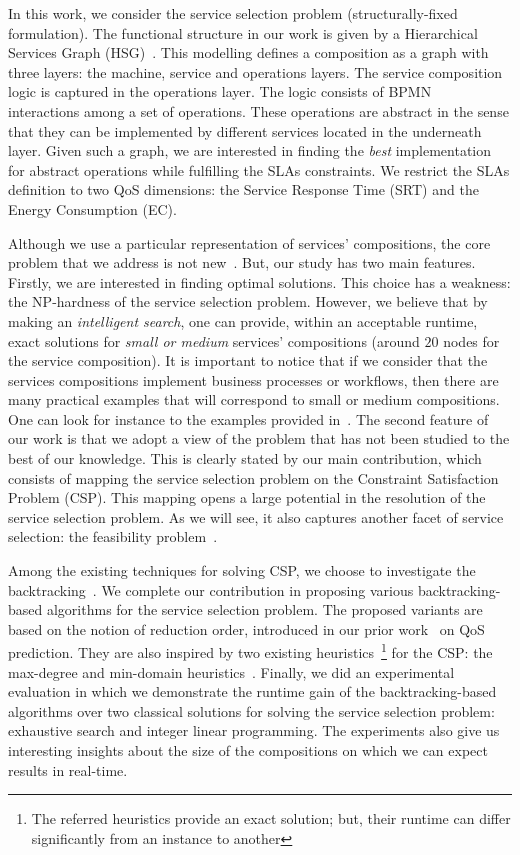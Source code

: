 \documentclass[a4paper]{article}
\begin{document}
In this work, we consider the service selection problem (structurally-fixed formulation). The functional 
structure in our work is given by a Hierarchical Services Graph (HSG)~\cite{GoldmanNgoko}. This modelling defines 
a  composition as a graph with three layers: the machine, service and operations layers. The service composition 
logic is captured in the operations layer. The logic consists of BPMN~\cite{Weske2007} interactions 
among a set of operations. These operations are abstract in the sense that they can be 
implemented by different services located in the underneath layer. Given such a graph, 
we are interested  in finding the {\it best} implementation for abstract operations while fulfilling the SLAs constraints. 
We restrict the SLAs definition to two QoS dimensions:  the Service Response Time (SRT) and the Energy Consumption (EC). 

Although we use a particular representation of services' compositions, the core problem that we address is not 
new~\cite{Alrifai,BenMokhtar,Zheng,Ardagna,JISA}. But, our study has two main features. Firstly, we are interested in 
finding optimal solutions. This choice has a weakness: the NP-hardness of the service selection problem. However, 
we believe that by making an  {\it intelligent search}, one can provide, within an acceptable runtime,  
exact solutions for {\it small or medium} services' compositions (around $20$ nodes for the service composition). 
It is important to notice that if we consider that the services compositions implement business processes or workflows, 
then there are many practical examples that will correspond to small or medium compositions. One can look 
for instance to the examples provided in~\cite{Omg,Freund}. 
The second feature of our work is that we adopt a view 
of the problem that has not been studied to the best of our knowledge. This is clearly stated by our 
main contribution, which consists of mapping the service selection problem on the Constraint Satisfaction 
Problem (CSP). This mapping opens a 
large potential in the resolution of the service selection problem. As we will see, 
it also captures another facet of service selection: the feasibility problem~\cite{Ardagna,JISA}. 

Among the existing
techniques for solving CSP, we choose to investigate the 
backtracking~\cite{Baker95intelligentbacktracking}. We complete our contribution in proposing various 
backtracking-based algorithms for the service selection problem. The proposed variants are based on the notion of 
reduction order, introduced in our prior work~\cite{GoldmanNgoko} on QoS prediction. They are also inspired by two 
existing heuristics~\footnote{The referred heuristics provide an exact solution; but, their runtime can differ significantly 
from an instance to another} for the CSP:  the max-degree and min-domain heuristics~\cite{Baker95intelligentbacktracking}. 
Finally, we did an experimental evaluation in which we demonstrate the runtime gain of the backtracking-based 
algorithms over two classical solutions for solving the service selection 
problem: exhaustive search and integer linear programming. The experiments also give us interesting insights about 
the size of the compositions on which we can expect results in real-time. 
\end{document}
